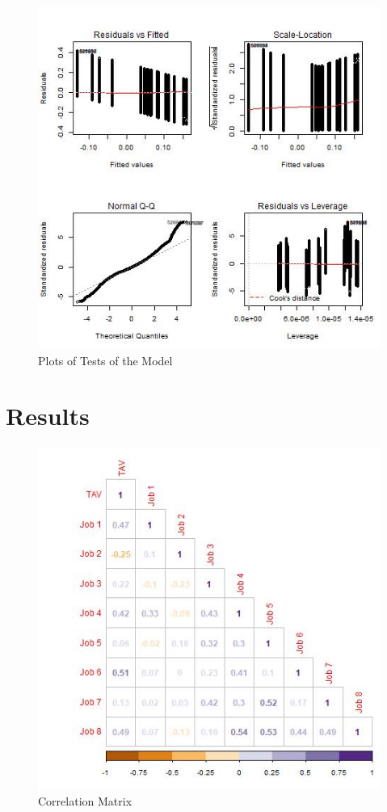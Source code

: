 \documentclass{article}
\begin{document}
\begin{figure}[H]
    \centering
    \includegraphics[width= .8\linewidth]{images/plot_matrix.jpeg}
    \caption{Plots of Tests of the Model}
    \label{fig: plot_matrix}
\end{figure}



\section{Results}










\begin{figure}[H]
    \centering
    \includegraphics[width=.6\linewidth]{images/corr_matrix.jpeg}
    \caption{Correlation Matrix}
    \label{fig:corrMatrix}
\end{figure}
\end{document}
